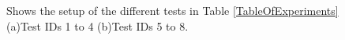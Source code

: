 \begin{figure}[h] 
\label{TestsDiagrams}
  \centering
  \caption{Shows the setup of the different tests in Table \ref{TableOfExperiments} (a)Test IDs 1 to 4 (b)Test IDs 5 to 8.}
\end{figure}

